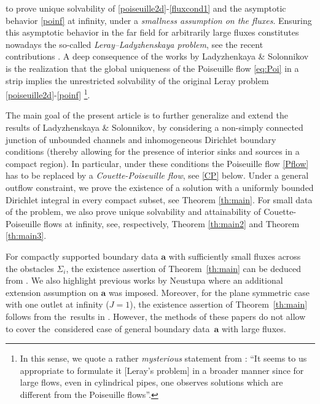 \documentclass[11pt]{article}
\numberwithin{equation}{section}
\numberwithin{figure}{section}
\def\ae{{\mathbf a}}
\begin{document}
\cite[Section 2]{ladyzhenskaya1983determination} to prove unique solvability of \eqref{poiseuille2d}-\eqref{fluxcond1} and the asymptotic
behavior \eqref{poinf} at infinity, under a {\it smallness assumption on the fluxes}. Ensuring this asymptotic behavior in the far field
for arbitrarily large fluxes constitutes nowadays the so-called
\textit{Leray--Ladyzhenskaya problem}, see the recent contributions \cite{wang2022existence,wang2022uniform}. A deep consequence of the works by Ladyzhenkaya \& Solonnikov is the realization that the global uniqueness of the Poiseuille flow \eqref{eq:Poi} in a strip implies the unrestricted solvability of the original Leray problem \eqref{poiseuille2d}-\eqref{poinf} \footnote{In this sense, we quote a rather \textit{mysterious} statement from \cite[page 734]{ladyzhenskaya1983determination}: “It seems to us appropriate
to formulate it [Leray's problem] in a broader manner since for large flows, even in cylindrical pipes, one
observes solutions which are different from the Poiseuille flows''.}.

The main goal of the present article is to further generalize and extend the results of Ladyzhenskaya \& Solonnikov,
by considering a non-simply connected junction of unbounded channels and inhomogeneous Dirichlet boundary conditions (thereby allowing for the presence of interior sinks and sources
in a compact region). In particular, under these conditions the Poiseuille flow \eqref{Pflow} has to
be replaced by a {\it Couette-Poiseuille flow}, see \eqref{CP} below. Under a general outflow constraint, we prove the existence of a solution with a
uniformly bounded Dirichlet integral in every compact subset, see Theorem \ref{th:main}. For small data of the problem, we also prove unique solvability and attainability of Couette-Poiseuille flows at infinity, see, respectively, Theorem \ref{th:main2} and Theorem \ref{th:main3}. 

For compactly supported boundary data $\textbf{a}$ with sufficiently small fluxes across the obstacles $\Sigma_i$, the existence assertion of
Theorem~\ref{th:main} can be deduced from \cite{kaulakyte2012nonhomogeneous}. We also highlight previous works by Neustupa \cite{neustupa2009steady,neustupa2010new} where an additional extension assumption on $\textbf{a}$ was imposed. Moreover, for the plane symmetric case with one outlet at infinity
($J=1$), the existence assertion of Theorem~\ref{th:main} follows from the~results in \cite{chipot2017nonhomogeneous}. However, the methods of these
papers do not allow to cover the~considered case of general boundary data~$\ae$ with large fluxes.
\end{document}

